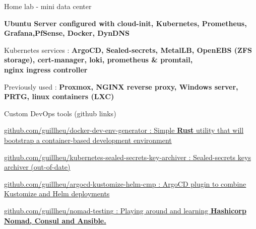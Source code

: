 
\begin{cventries}
  \cventry
    {} %
    {Home lab - mini data center} %
    {} %
    {} %
    {
      \begin{cvitems} %
        \item {\textbf{Ubuntu Server configured with cloud-init, Kubernetes, Prometheus, Grafana,PfSense, Docker, DynDNS}}
        \item {Kubernetes services : \textbf{ArgoCD, Sealed-secrets, MetalLB, OpenEBS (ZFS storage), cert-manager, loki, prometheus \& promtail,\\nginx ingress controller}}
        \item {Previously used : \textbf{Proxmox, NGINX reverse proxy, Windows server, PRTG, linux containers (LXC)}\\}
      \end{cvitems}
    }

  \cventry
  {} %
  {Custom DevOps tools (github links)} %
  {} %
  {} %
  {
    \begin{cvitems} %
      \item {\href{https://github.com/guillheu/docker-dev-env-generator}{\underline{github.com/guillheu/docker-dev-env-generator} : Simple \textbf{Rust} utility that will bootstrap a container-based development environment}}
      \item {\href{https://github.com/guillheu/kubernetes-sealed-secrets-key-archiver}{\underline{github.com/guillheu/kubernetes-sealed-secrets-key-archiver} : Sealed-secrets keys archiver (out-of-date)}}
      \item {\href{https://github.com/guillheu/argocd-kustomize-helm-cmp}{\underline{github.com/guillheu/argocd-kustomize-helm-cmp} : ArgoCD plugin to combine Kustomize and Helm deployments}}
      \item {\href{https://github.com/guillheu/nomad-testing}{\underline{github.com/guillheu/nomad-testing} : Playing around and learning \textbf{Hashicorp Nomad, Consul and Ansible.}}\\}
    \end{cvitems}
  }
  

\end{cventries}
